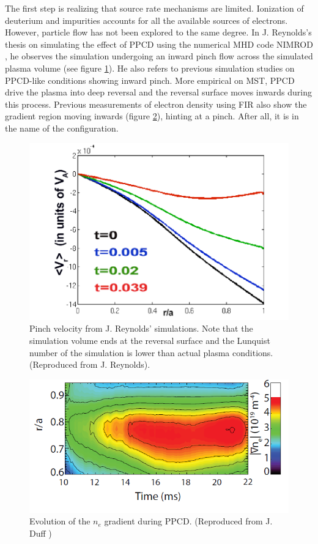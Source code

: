 The first step is realizing that source rate mechanisms are limited. Ionization of deuterium and impurities accounts for all the available sources of electrons. However, particle flow has not been explored to the same degree. In J. Reynolds's thesis on simulating the effect of PPCD using the numerical MHD code NIMROD \cite{Reynolds2007}, he observes the simulation undergoing an inward pinch flow across the simulated plasma volume (see figure \ref{fig:NIMROD_pinch}). He also refers to previous simulation studies on PPCD-like conditions showing inward pinch\cite{StuffThatReynoldCited}. More empirical on MST, PPCD drive the plasma into deep reversal and the reversal surface moves inwards during this process. Previous measurements of electron density using FIR also show the gradient region moving inwards (figure \ref{fig:ne_gradient_pinch}), hinting at a pinch. After all, it is in the name of the configuration.

\begin{figure}
    \centering
    \includegraphics[width = 5.5in]{ion_transport_results/reynold_pinch.png}
    \caption[Pinch velocity from J. Reynolds' simulations]{Pinch velocity from J. Reynolds' simulations. Note that the simulation volume ends at the reversal surface and the Lunquist number of the simulation is lower than actual plasma conditions. (Reproduced from J. Reynolds\cite{ReynoldsThesis}). }
    \label{fig:NIMROD_pinch}
\end{figure}

\begin{figure}
    \centering
    \includegraphics[width = 0.8\linewidth]{ion_transport_results/duff_gradient.png}
    \caption[Evolution of the $n_e$ gradient during PPCD]{Evolution of the $n_e$ gradient during PPCD. (Reproduced from J. Duff \cite{Duff2018})}
    \label{fig:ne_gradient_pinch}
\end{figure}


